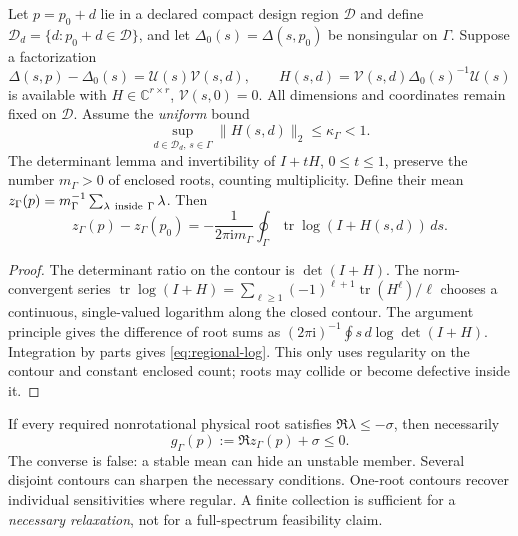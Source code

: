 \documentclass[11pt]{article}
\newcommand{\ii}{\mathrm{i}}
\begin{document}
Let $p=p_0+d$ lie in a declared compact design region $\mathcal D$ and
define $\mathcal D_d=\{d:p_0+d\in\mathcal D\}$, and let $\Delta_0(s)=\Delta(s,p_0)$ be nonsingular on $\Gamma$.
Suppose a factorization
\[
 \Delta(s,p)-\Delta_0(s)=\mathcal U(s)\mathcal V(s,d),\qquad
 H(s,d)=\mathcal V(s,d)\Delta_0(s)^{-1}\mathcal U(s)
\]
is available with $H\in\mathbb C^{r\times r}$, $\mathcal V(s,0)=0$.
All dimensions and coordinates remain fixed on $\mathcal D$.
Assume the \emph{uniform} bound
\begin{equation}
 \sup_{d\in\mathcal D_d,\,s\in\Gamma}\|H(s,d)\|_2
 \le\kappa_\Gamma<1 . \label{eq:regional-kappa}
\end{equation}
The determinant lemma and invertibility of $I+tH$, $0\le t\le1$,
preserve the number $m_\Gamma>0$ of enclosed roots, counting multiplicity.
Define their mean $z_\Gamma(p)=m_\Gamma^{-1}
\sum_{\lambda\ {\rm inside}\ \Gamma}\lambda$.
Then
\begin{equation}
 \boxed{z_\Gamma(p)-z_\Gamma(p_0)
 =-\frac{1}{2\pi\ii m_\Gamma}
       \oint_\Gamma \operatorname{tr}\log(I+H(s,d))\,ds .}
 \label{eq:regional-log}
\end{equation}
\begin{proof}
The determinant ratio on the contour is $\det(I+H)$.
The norm-convergent series
$\operatorname{tr}\log(I+H)=
\sum_{\ell\ge1}(-1)^{\ell+1}\operatorname{tr}(H^\ell)/\ell$
chooses a continuous, single-valued logarithm along the closed contour.
The argument principle gives the difference of root sums as
$(2\pi\ii)^{-1}\oint s\,d\log\det(I+H)$.
Integration by parts gives \eqref{eq:regional-log}.
This only uses regularity on the contour and constant enclosed count;
roots may collide or become defective inside it.
\end{proof}

If every required nonrotational physical root satisfies $\Re\lambda\le-\sigma$, then necessarily
\[
 g_\Gamma(p):=\Re z_\Gamma(p)+\sigma\le0.
\]
The converse is false: a stable mean can hide an unstable member.
Several disjoint contours can sharpen the necessary conditions.
One-root contours recover individual sensitivities where regular.
A finite collection is sufficient for a \emph{necessary relaxation},
not for a full-spectrum feasibility claim.
\end{document}
